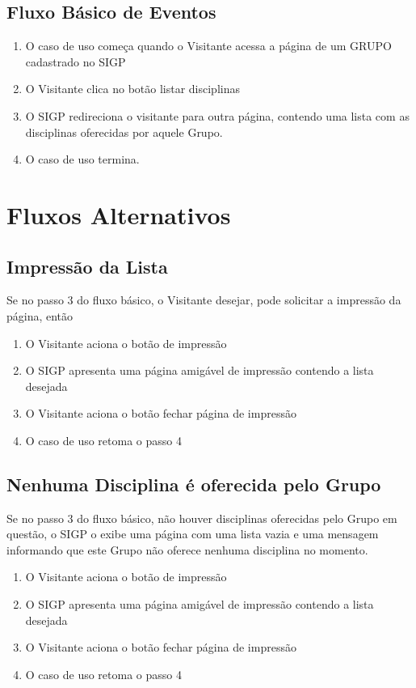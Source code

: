 \documentclass[11pt, a4paper,oneside]{book}
\begin{document}
\subsection{Fluxo Básico de Eventos}

\begin{enumerate}
\item O caso de uso começa quando o Visitante acessa a página de um GRUPO cadastrado no SIGP
\item O Visitante clica no botão listar disciplinas
\item O SIGP redireciona o visitante para outra página, contendo uma lista com as disciplinas oferecidas por aquele Grupo.
\item O caso de uso termina.
\end{enumerate}

\section{Fluxos Alternativos}

\subsection{Impressão da Lista}
Se no passo $3$ do fluxo básico, o Visitante desejar, pode solicitar a impressão da página, então

\begin{enumerate}
\item O Visitante aciona o botão de impressão
\item O SIGP apresenta uma página amigável de impressão contendo a lista desejada
\item O Visitante aciona o botão fechar página de impressão
\item O caso de uso retoma o passo 4
\end{enumerate}

\subsection{Nenhuma Disciplina é oferecida pelo Grupo}
Se no passo $3$ do fluxo básico, não houver disciplinas oferecidas pelo Grupo em questão, o SIGP o exibe uma página com uma lista vazia e uma mensagem informando que este Grupo não oferece nenhuma disciplina no momento.

\begin{enumerate}
\item O Visitante aciona o botão de impressão
\item O SIGP apresenta uma página amigável de impressão contendo a lista desejada
\item O Visitante aciona o botão fechar página de impressão
\item O caso de uso retoma o passo 4
\end{enumerate}
\end{document}
